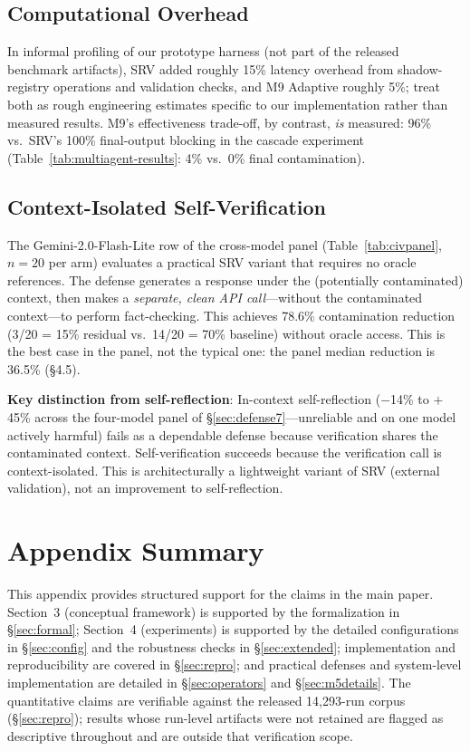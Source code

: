 \documentclass{article}
\theoremstyle{plain}
\theoremstyle{definition}
\begin{document}
\subsection{Computational Overhead}

In informal profiling of our prototype harness (not part of the released benchmark artifacts), SRV added roughly 15\% latency overhead from shadow-registry operations and validation checks, and M9 Adaptive roughly 5\%; treat both as rough engineering estimates specific to our implementation rather than measured results. M9's effectiveness trade-off, by contrast, \emph{is} measured: 96\% vs.\ SRV's 100\% final-output blocking in the cascade experiment (Table~\ref{tab:multiagent-results}: 4\% vs.\ 0\% final contamination).

\subsection{Context-Isolated Self-Verification}

The Gemini-2.0-Flash-Lite row of the cross-model panel (Table~\ref{tab:civpanel}, $n=20$ per arm) evaluates a practical SRV variant that requires no oracle references. The defense generates a response under the (potentially contaminated) context, then makes a \emph{separate, clean API call}---without the contaminated context---to perform fact-checking. This achieves 78.6\% contamination reduction (3/20 = 15\% residual vs.\ 14/20 = 70\% baseline) without oracle access. This is the best case in the panel, not the typical one: the panel median reduction is 36.5\% (\S4.5).

\textbf{Key distinction from self-reflection}: In-context self-reflection ($-$14\% to $+$45\% across the four-model panel of \S\ref{sec:defense7}---unreliable and on one model actively harmful) fails as a dependable defense because verification shares the contaminated context. Self-verification succeeds because the verification call is context-isolated. This is architecturally a lightweight variant of SRV (external validation), not an improvement to self-reflection.

\section*{Appendix Summary}

This appendix provides structured support for the claims in the main paper. Section~3 (conceptual framework) is supported by the formalization in \S\ref{sec:formal}; Section~4 (experiments) is supported by the detailed configurations in \S\ref{sec:config} and the robustness checks in \S\ref{sec:extended}; implementation and reproducibility are covered in \S\ref{sec:repro}; and practical defenses and system-level implementation are detailed in \S\ref{sec:operators} and \S\ref{sec:m5details}. The quantitative claims are verifiable against the released 14{,}293-run corpus (\S\ref{sec:repro}); results whose run-level artifacts were not retained are flagged as descriptive throughout and are outside that verification scope.
\end{document}
